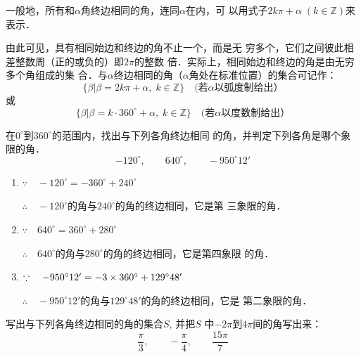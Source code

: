 一般地，所有和$\alpha$角终边相同的角，连同$\alpha$在内，可
以用式子$2k\pi+\alpha\; (k\in\mathbb{Z})$来表示．

由此可见，具有相同始边和终边的角不止一个，而是无
穷多个，它们之间彼此相差整数周（正的或负的）即$2\pi$的整数
倍．实际上，相同始边和终边的角是由无穷多个角组成的集
合．与$\alpha$终边相同的角（$\alpha$角处在标准位置）的集合可记作：
\[\{\beta|\beta=2k\pi+\alpha,\; k\in\mathbb{Z}\}\quad  \text{(若$\alpha$以弧度制给出）}\]
或
\[\{\beta|\beta=k\cdot 360^{\circ}+\alpha,\; k\in\mathbb{Z}\}\quad  \text{(若$\alpha$以度数制给出）}\]


\begin{example}
    在$0^{\circ}$到$360^{\circ}$的范围内，找出与下列各角终边相同
的角，并判定下列各角是哪个象限的角．
\[-120^{\circ},\qquad 640^{\circ},\qquad -950^{\circ}12'\]

\end{example}


\begin{solution}
\begin{enumerate}
    \item $\because\quad -120^{\circ}=-360^{\circ}+240^{\circ}$
    
$\therefore\quad -120^{\circ}$的角与$240^{\circ}$的角的终边相同，它是第
三象限的角．
\item $\because\quad 640^{\circ}=360^{\circ}+280^{\circ}$

$\therefore\quad 640^{\circ}$的角与$280^{\circ}$的角的终边相同，它是第四象限
的角．

\item $\because\quad -950^{\circ}12'=-3\times 360^{\circ}+129^{\circ}48'$

$\therefore\quad -950^{\circ}12'$的角与$129^{\circ}48'$的角的终边相同，它是
第二象限的角．
\end{enumerate}
\end{solution}

\begin{example}
写出与下列各角终边相同的角的集合$S$, 并把$S$
中$-2\pi$到$4\pi$间的角写出来：
\[\frac{\pi}{3},\qquad -\frac{\pi}{4},\qquad \frac{15\pi}{7}\]
\end{example}


